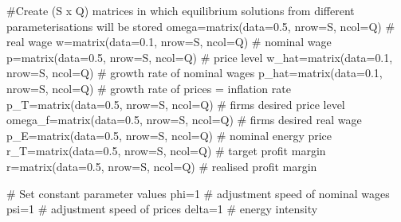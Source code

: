 \documentclass[
  letterpaper,
  DIV=11,
  numbers=noendperiod]{scrreprt}
\newenvironment{Shaded}{\begin{snugshade}}{\end{snugshade}}
\newcommand{\AttributeTok}[1]{\textcolor[rgb]{0.40,0.45,0.13}{#1}}
\newcommand{\CommentTok}[1]{\textcolor[rgb]{0.37,0.37,0.37}{#1}}
\newcommand{\DecValTok}[1]{\textcolor[rgb]{0.68,0.00,0.00}{#1}}
\newcommand{\FloatTok}[1]{\textcolor[rgb]{0.68,0.00,0.00}{#1}}
\newcommand{\FunctionTok}[1]{\textcolor[rgb]{0.28,0.35,0.67}{#1}}
\newcommand{\NormalTok}[1]{\textcolor[rgb]{0.00,0.23,0.31}{#1}}
\newcommand{\OtherTok}[1]{\textcolor[rgb]{0.00,0.23,0.31}{#1}}
\begin{document}
\begin{Shaded}
\begin{Highlighting}[]
\CommentTok{\#Create (S x Q) matrices in which equilibrium solutions from different parameterisations will be stored}
\NormalTok{omega}\OtherTok{=}\FunctionTok{matrix}\NormalTok{(}\AttributeTok{data=}\FloatTok{0.5}\NormalTok{, }\AttributeTok{nrow=}\NormalTok{S, }\AttributeTok{ncol=}\NormalTok{Q)   }\CommentTok{\# real wage}
\NormalTok{w}\OtherTok{=}\FunctionTok{matrix}\NormalTok{(}\AttributeTok{data=}\FloatTok{0.1}\NormalTok{, }\AttributeTok{nrow=}\NormalTok{S, }\AttributeTok{ncol=}\NormalTok{Q)       }\CommentTok{\# nominal wage}
\NormalTok{p}\OtherTok{=}\FunctionTok{matrix}\NormalTok{(}\AttributeTok{data=}\FloatTok{0.5}\NormalTok{, }\AttributeTok{nrow=}\NormalTok{S, }\AttributeTok{ncol=}\NormalTok{Q)       }\CommentTok{\# price level}
\NormalTok{w\_hat}\OtherTok{=}\FunctionTok{matrix}\NormalTok{(}\AttributeTok{data=}\FloatTok{0.1}\NormalTok{, }\AttributeTok{nrow=}\NormalTok{S, }\AttributeTok{ncol=}\NormalTok{Q)   }\CommentTok{\# growth rate of nominal wages}
\NormalTok{p\_hat}\OtherTok{=}\FunctionTok{matrix}\NormalTok{(}\AttributeTok{data=}\FloatTok{0.1}\NormalTok{, }\AttributeTok{nrow=}\NormalTok{S, }\AttributeTok{ncol=}\NormalTok{Q)   }\CommentTok{\# growth rate of prices = inflation rate}
\NormalTok{p\_T}\OtherTok{=}\FunctionTok{matrix}\NormalTok{(}\AttributeTok{data=}\FloatTok{0.5}\NormalTok{, }\AttributeTok{nrow=}\NormalTok{S, }\AttributeTok{ncol=}\NormalTok{Q)     }\CommentTok{\# firms\textquotesingle{} desired price level}
\NormalTok{omega\_f}\OtherTok{=}\FunctionTok{matrix}\NormalTok{(}\AttributeTok{data=}\FloatTok{0.5}\NormalTok{, }\AttributeTok{nrow=}\NormalTok{S, }\AttributeTok{ncol=}\NormalTok{Q) }\CommentTok{\# firms\textquotesingle{} desired real wage }
\NormalTok{p\_E}\OtherTok{=}\FunctionTok{matrix}\NormalTok{(}\AttributeTok{data=}\FloatTok{0.5}\NormalTok{, }\AttributeTok{nrow=}\NormalTok{S, }\AttributeTok{ncol=}\NormalTok{Q)   }\CommentTok{\# nominal energy price}
\NormalTok{r\_T}\OtherTok{=}\FunctionTok{matrix}\NormalTok{(}\AttributeTok{data=}\FloatTok{0.5}\NormalTok{, }\AttributeTok{nrow=}\NormalTok{S, }\AttributeTok{ncol=}\NormalTok{Q)     }\CommentTok{\# target profit margin}
\NormalTok{r}\OtherTok{=}\FunctionTok{matrix}\NormalTok{(}\AttributeTok{data=}\FloatTok{0.5}\NormalTok{, }\AttributeTok{nrow=}\NormalTok{S, }\AttributeTok{ncol=}\NormalTok{Q)       }\CommentTok{\# realised profit margin}

\CommentTok{\# Set constant parameter values}
\NormalTok{phi}\OtherTok{=}\DecValTok{1}     \CommentTok{\# adjustment speed of nominal wages}
\NormalTok{psi}\OtherTok{=}\DecValTok{1}   \CommentTok{\# adjustment speed of prices}
\NormalTok{delta}\OtherTok{=}\DecValTok{1}   \CommentTok{\# energy intensity}


\end{Highlighting}
\end{Shaded}
\end{document}

